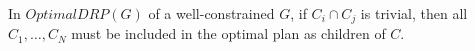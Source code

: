 



\begin{theorem}\label{theorem:main_wellconstrained}
In $OptimalDRP(G)$ of a well-constrained $G$, if $C_i \cap C_j$ is trivial, then all $C_1,\ldots, C_N$ must be included in the optimal plan as children of $C$.
\end{theorem}




